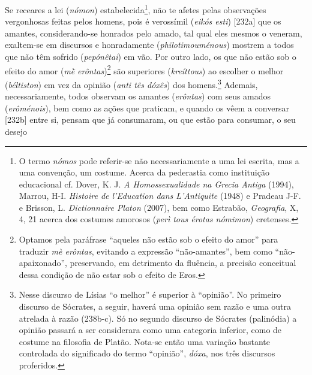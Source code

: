 Se receares a lei (\emph{nómon}) estabelecida\footnote{O termo
  \emph{nómos} pode referir-se não necessariamente a uma lei escrita,
  mas a uma convenção, um costume. Acerca da pederastia como instituição
  educacional cf. Dover, K. J. \emph{A Homossexualidade na Grecia
  Antiga} (1994), Marrou, H-I. \emph{Histoire de l'Education dans
  L'Antiquite} (1948) e Pradeau J-F. e Brisson, L. \emph{Dictionnaire
  Platon} (2007), bem como Estrabão, \emph{Geografia}, X, 4, 21 acerca
  dos costumes amorosos (\emph{perì tous érotas nómimon}) cretenses.},
não te afetes pelas observações vergonhosas feitas pelos homens, pois é
verossímil (\emph{eikós esti}) {[}232a{]} que os amantes,
considerando-se honrados pelo amado, tal qual eles mesmos o veneram,
exaltem-se em discursos e honradamente (\emph{philotimouménous}) mostrem
a todos que não têm sofrido (\emph{pepónêtai}) em vão. Por outro lado,
os que não estão sob o efeito do amor (\emph{mḕ}
\emph{erôntas})\footnote{Optamos pela paráfrase ``aqueles não estão sob
  o efeito do amor'' para traduzir \emph{mè erôntas}, evitando a
  expressão ``não-amantes'', bem como ``não-apaixonado'', preservando,
  em detrimento da fluência, a precisão conceitual dessa condição de não
  estar sob o efeito de Eros.} são superiores (\emph{kreíttous}) ao
escolher o melhor (\emph{béltiston}) em vez da opinião (\emph{anti tês
dóxês}) dos homens.\footnote{Nesse discurso de Lísias ``o melhor'' é
  superior à ``opinião''. No primeiro discurso de Sócrates, a seguir,
  haverá uma opinião sem razão e uma outra atrelada à razão (238b-c). Só
  no segundo discurso de Sócrates (palinódia) a opinião passará a ser
  considerara como uma categoria inferior, como de costume na filosofia
  de Platão. Nota-se então uma variação bastante controlada do
  significado do termo ``opinião'', \emph{dóxa}, nos três discursos
  proferidos.} Ademais, necessariamente, todos observam os amantes
(\emph{erôntas}) com seus amados (\emph{erôménois}), bem como as ações
que praticam, e quando os vêem a conversar {[}232b{]} entre si, pensam
que já consumaram, ou que estão para consumar, o seu desejo
